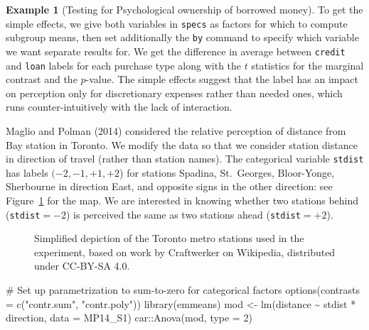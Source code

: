 \documentclass[
  11pt,
  letterpaper,
]{scrbook}
\newenvironment{Shaded}{\begin{snugshade}}{\end{snugshade}}
\newcommand{\AttributeTok}[1]{\textcolor[rgb]{0.40,0.45,0.13}{#1}}
\newcommand{\CommentTok}[1]{\textcolor[rgb]{0.37,0.37,0.37}{#1}}
\newcommand{\DecValTok}[1]{\textcolor[rgb]{0.68,0.00,0.00}{#1}}
\newcommand{\FunctionTok}[1]{\textcolor[rgb]{0.28,0.35,0.67}{#1}}
\newcommand{\NormalTok}[1]{\textcolor[rgb]{0.00,0.23,0.31}{#1}}
\newcommand{\OtherTok}[1]{\textcolor[rgb]{0.00,0.23,0.31}{#1}}
\newcommand{\SpecialCharTok}[1]{\textcolor[rgb]{0.37,0.37,0.37}{#1}}
\newcommand{\StringTok}[1]{\textcolor[rgb]{0.13,0.47,0.30}{#1}}
\theoremstyle{definition}
\theoremstyle{definition}
\newtheorem{example}{Example}[chapter]
\theoremstyle{remark}
\begin{document}
\begin{example}[Testing for Psychological ownership of borrowed
money]
To get the simple effects, we give both variables in \texttt{specs} as
factors for which to compute subgroup means, then set additionally the
\texttt{by} command to specify which variable we want separate results
for. We get the difference in average between \texttt{credit} and
\texttt{loan} labels for each purchase type along with the \(t\)
statistics for the marginal contrast and the \(p\)-value. The simple
effects suggest that the label has an impact on perception only for
discretionary expenses rather than needed ones, which runs
counter-intuitively with the lack of interaction.

\end{example}

Maglio and Polman (2014) considered the relative perception of distance
from Bay station in Toronto. We modify the data so that we consider
station distance in direction of travel (rather than station names). The
categorical variable \texttt{stdist} has labels \((-2, -1, +1, +2\)) for
stations Spadina, St.~Georges, Bloor-Yonge, Sherbourne in direction
East, and opposite signs in the other direction: see
Figure~\ref{fig-Torontosubway} for the map. We are interested in knowing
whether two stations behind (\texttt{stdist}\(=-2\)) is perceived the
same as two stations ahead (\texttt{stdist}\(=+2\)).

\begin{figure}[ht!]


\caption{\label{fig-Torontosubway}Simplified depiction of the Toronto
metro stations used in the experiment, based on work by Craftwerker on
Wikipedia, distributed under CC-BY-SA 4.0.}

\end{figure}%

\begin{Shaded}
\begin{Highlighting}[]
\CommentTok{\# Set up parametrization to sum{-}to{-}zero for categorical factors}
\FunctionTok{options}\NormalTok{(}\AttributeTok{contrasts =} \FunctionTok{c}\NormalTok{(}\StringTok{"contr.sum"}\NormalTok{, }\StringTok{"contr.poly"}\NormalTok{))}
\FunctionTok{library}\NormalTok{(emmeans)}
\NormalTok{mod }\OtherTok{\textless{}{-}} \FunctionTok{lm}\NormalTok{(distance }\SpecialCharTok{\textasciitilde{}}\NormalTok{ stdist }\SpecialCharTok{*}\NormalTok{ direction, }\AttributeTok{data =}\NormalTok{ MP14\_S1) }
\NormalTok{car}\SpecialCharTok{::}\FunctionTok{Anova}\NormalTok{(mod, }\AttributeTok{type =} \DecValTok{2}\NormalTok{)}
\end{Highlighting}
\end{Shaded}
\end{document}
